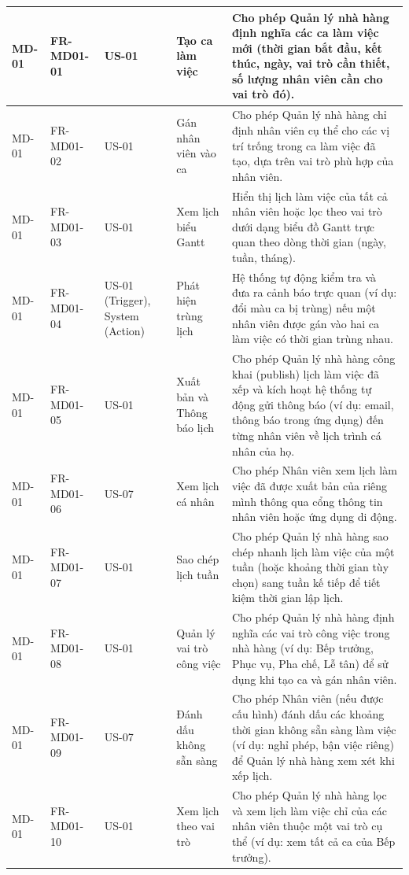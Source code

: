 \begin{longtable}{|m{2cm}|m{2.5cm}|m{2cm}|m{4cm}|m{4.5cm}|}
MD-01 & FR-MD01-01 & US-01 & Tạo ca làm việc & Cho phép Quản lý nhà hàng định nghĩa các ca làm việc mới (thời gian bắt đầu, kết thúc, ngày, vai trò cần thiết, số lượng nhân viên cần cho vai trò đó). \\
\hline
MD-01 & FR-MD01-02 & US-01 & Gán nhân viên vào ca & Cho phép Quản lý nhà hàng chỉ định nhân viên cụ thể cho các vị trí trống trong ca làm việc đã tạo, dựa trên vai trò phù hợp của nhân viên. \\
\hline
MD-01 & FR-MD01-03 & US-01 & Xem lịch biểu Gantt & Hiển thị lịch làm việc của tất cả nhân viên hoặc lọc theo vai trò dưới dạng biểu đồ Gantt trực quan theo dòng thời gian (ngày, tuần, tháng). \\
\hline
MD-01 & FR-MD01-04 & US-01 (Trigger), System (Action) & Phát hiện trùng lịch & Hệ thống tự động kiểm tra và đưa ra cảnh báo trực quan (ví dụ: đổi màu ca bị trùng) nếu một nhân viên được gán vào hai ca làm việc có thời gian trùng nhau. \\
\hline
MD-01 & FR-MD01-05 & US-01 & Xuất bản và Thông báo lịch & Cho phép Quản lý nhà hàng công khai (publish) lịch làm việc đã xếp và kích hoạt hệ thống tự động gửi thông báo (ví dụ: email, thông báo trong ứng dụng) đến từng nhân viên về lịch trình cá nhân của họ. \\
\hline
MD-01 & FR-MD01-06 & US-07 & Xem lịch cá nhân & Cho phép Nhân viên xem lịch làm việc đã được xuất bản của riêng mình thông qua cổng thông tin nhân viên hoặc ứng dụng di động. \\
\hline
MD-01 & FR-MD01-07 & US-01 & Sao chép lịch tuần & Cho phép Quản lý nhà hàng sao chép nhanh lịch làm việc của một tuần (hoặc khoảng thời gian tùy chọn) sang tuần kế tiếp để tiết kiệm thời gian lập lịch. \\
\hline
MD-01 & FR-MD01-08 & US-01 & Quản lý vai trò công việc & Cho phép Quản lý nhà hàng định nghĩa các vai trò công việc trong nhà hàng (ví dụ: Bếp trưởng, Phục vụ, Pha chế, Lễ tân) để sử dụng khi tạo ca và gán nhân viên. \\
\hline
MD-01 & FR-MD01-09 & US-07 & Đánh dấu không sẵn sàng & Cho phép Nhân viên (nếu được cấu hình) đánh dấu các khoảng thời gian không sẵn sàng làm việc (ví dụ: nghỉ phép, bận việc riêng) để Quản lý nhà hàng xem xét khi xếp lịch. \\ %
\hline
MD-01 & FR-MD01-10 & US-01 & Xem lịch theo vai trò & Cho phép Quản lý nhà hàng lọc và xem lịch làm việc chỉ của các nhân viên thuộc một vai trò cụ thể (ví dụ: xem tất cả ca của Bếp trưởng). \\ %
\hline

\end{longtable}


